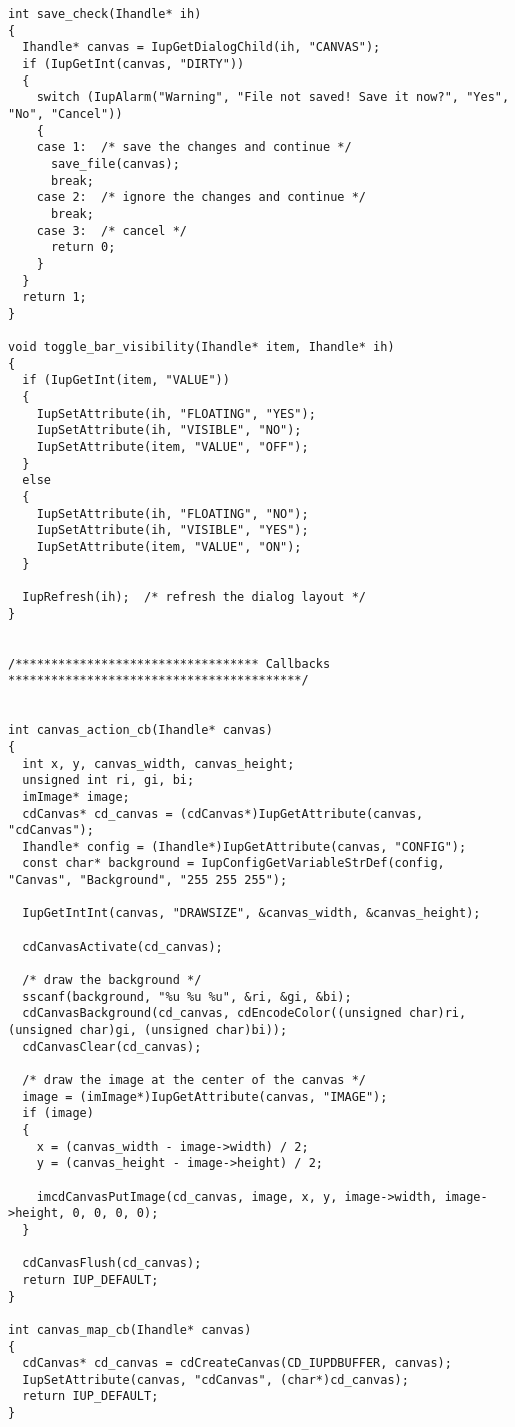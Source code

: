 \documentclass{ctexart}
\begin{document}
\begin{lstlisting}
int save_check(Ihandle* ih)
{
  Ihandle* canvas = IupGetDialogChild(ih, "CANVAS");
  if (IupGetInt(canvas, "DIRTY"))
  {
    switch (IupAlarm("Warning", "File not saved! Save it now?", "Yes", "No", "Cancel"))
    {
    case 1:  /* save the changes and continue */
      save_file(canvas);
      break;
    case 2:  /* ignore the changes and continue */
      break;
    case 3:  /* cancel */
      return 0;  
    }
  }
  return 1;
}

void toggle_bar_visibility(Ihandle* item, Ihandle* ih)
{
  if (IupGetInt(item, "VALUE"))
  {
    IupSetAttribute(ih, "FLOATING", "YES");
    IupSetAttribute(ih, "VISIBLE", "NO");
    IupSetAttribute(item, "VALUE", "OFF");
  }
  else
  {
    IupSetAttribute(ih, "FLOATING", "NO");
    IupSetAttribute(ih, "VISIBLE", "YES");
    IupSetAttribute(item, "VALUE", "ON");
  }

  IupRefresh(ih);  /* refresh the dialog layout */
}


/********************************** Callbacks *****************************************/


int canvas_action_cb(Ihandle* canvas)
{
  int x, y, canvas_width, canvas_height;
  unsigned int ri, gi, bi;
  imImage* image;
  cdCanvas* cd_canvas = (cdCanvas*)IupGetAttribute(canvas, "cdCanvas");
  Ihandle* config = (Ihandle*)IupGetAttribute(canvas, "CONFIG");
  const char* background = IupConfigGetVariableStrDef(config, "Canvas", "Background", "255 255 255");

  IupGetIntInt(canvas, "DRAWSIZE", &canvas_width, &canvas_height);

  cdCanvasActivate(cd_canvas);

  /* draw the background */
  sscanf(background, "%u %u %u", &ri, &gi, &bi);
  cdCanvasBackground(cd_canvas, cdEncodeColor((unsigned char)ri, (unsigned char)gi, (unsigned char)bi));
  cdCanvasClear(cd_canvas);

  /* draw the image at the center of the canvas */
  image = (imImage*)IupGetAttribute(canvas, "IMAGE");
  if (image)
  {
    x = (canvas_width - image->width) / 2;
    y = (canvas_height - image->height) / 2;

    imcdCanvasPutImage(cd_canvas, image, x, y, image->width, image->height, 0, 0, 0, 0);
  }

  cdCanvasFlush(cd_canvas);
  return IUP_DEFAULT;
}

int canvas_map_cb(Ihandle* canvas)
{
  cdCanvas* cd_canvas = cdCreateCanvas(CD_IUPDBUFFER, canvas);
  IupSetAttribute(canvas, "cdCanvas", (char*)cd_canvas);
  return IUP_DEFAULT;
}


\end{lstlisting}
\end{document}
